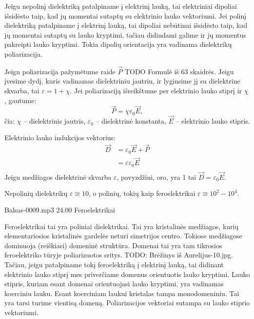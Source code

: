 \begin{note}
  Jeigu nepolinį dielektriką patalpiname į elektrinį lauką, tai
  elektriniai dipoliai išsidėsto taip, kad jų momentai sutaptų
  su elektrinio lauko vektoriumi.
  Jei polinį dielektriką patalpiname į elektrinį lauką, tai
  dipoliai nebūtinai išsidėsto taip, kad jų momentai sutaptų
  su lauko kryptimi, tačiau didindami galime ir jų momentus
  pakreipti lauko kryptimi.
  Tokia dipolių orientacija yra vadinama dielektrikų poliarizacija.

  Jeigu poliarizacija pažymėtume raide $\vec{P}$ TODO Formulė iš 63
  skaidrės. Jeigu įvesime dydį, kuris vadinamas dielektriniu jautriu,
  ir lyginsime jį su dielektrine skvarba, tai
  $\varepsilon = 1 + \chi$. Jei poliarizaciją išreikštume per
  elektrinio lauko stiprį ir $\chi$, gautume:
  \begin{equation*}
    \vec{P} = \chi \varepsilon_{0} \vec{E},
  \end{equation*}
  čia: $\chi$ – dielektrinis jautris, $\varepsilon_{0}$ – dielektrinė
  konstanta, $\vec{E}$ – elektrinio lauko stipris.

  Elektrinio lauko indukcijos vektorius:
  \begin{align*}
    \vec{D}
    &= \varepsilon_{0} \vec{E} + \vec{P} \\
    &= \varepsilon\varepsilon_{0} \vec{E} \\
  \end{align*}
  Jeigu medžiagos dielektrinė skvarba $\varepsilon$, pavyzdžiui, oro,
  yra 1 tai $\vec{D} = \varepsilon_{0} \vec{E}$.

  Nepolinių dielektrikų $\varepsilon \cong 10$, o polinių, tokių kaip
  feroelektrikai $\varepsilon \cong 10^{2}-10^{4}$.

  Balsas-0009.mp3 24:00 Feroelektrikai

  Feroelektrikai tai yra poliniai dielektrikai. Tai yra kristalinės
  medžiagos, kurių elementariosios kristalinės gardelės neturi
  simetrijos centro. Tokiose medžiagose dominuoja (reiškiasi)
  domeninė struktūra. Domenai tai yra tam tikrosios feroelektriko
  tūryje poliarizuotos sritys. TODO: Brėžinys iš Aurelijus-10.jpg.
  Tačiau, jeigu patalpiname tokį feroelektriką į elektrinį lauką,
  tai didinant elektrinio lauko stiprį mes priverčiame domenus
  orientuotis lauko kryptimi. Lauko stipris, kuriam esant domenai
  orientuojasi lauko kryptimi, yra vadinamas koerciniu lauku.
  Esant koerciniam laukui kristalas tampa monodomeniniu. Tai
  yra tarsi turime vientisą domeną. Poliarizacijos vektoriai
  sutampa su lauko stiprio vektoriumi.
  

\end{note}
